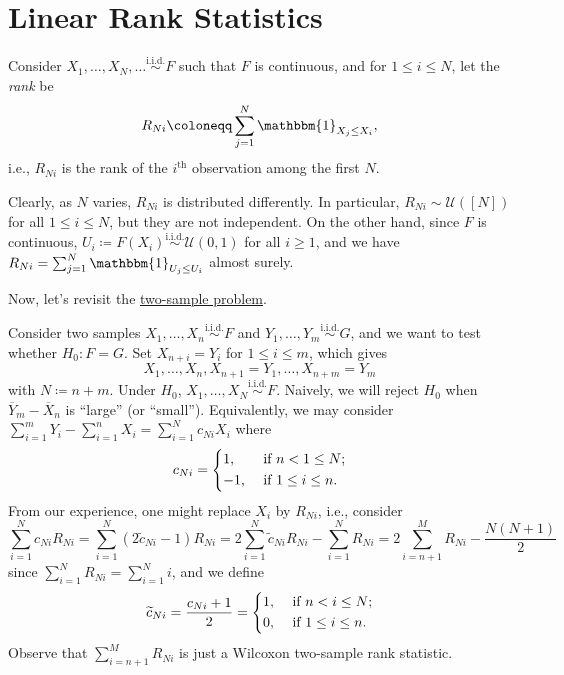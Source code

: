 \section{Linear Rank Statistics}
Consider \(X_1, \dots , X_N, \dots \overset{\text{i.i.d.} }{\sim } F\) such that \(F\) is continuous, and for \(1 \leq i \leq N\), let the \emph{rank} be
\[
	R_{Ni}
	\coloneqq \sum_{j=1}^{N} \mathbbm{1}_{X_j \leq X_i},
\]
i.e., \(R_{Ni}\) is the rank of the \(i^{\text{th} }\) observation among the first \(N\).

\begin{remark}
	Clearly, as \(N\) varies, \(R_{Ni}\) is distributed differently. In particular, \(R_{Ni} \sim \mathcal{U} ([N])\) for all \(1 \leq i \leq N\), but they are not independent. On the other hand, since \(F\) is continuous, \(U_i \coloneqq F(X_i)\overset{\text{i.i.d.} }{\sim } \mathcal{U} (0, 1)\) for all \(i \geq 1\), and we have \(R_{Ni} = \sum_{j=1}^{N} \mathbbm{1}_{U_j \leq U_i} \) almost surely.
\end{remark}

Now, let's revisit the \hyperref[prb:two-sample]{two-sample problem}.

\begin{eg}
	Consider two samples \(X_1, \dots , X_n \overset{\text{i.i.d.} }{\sim } F\) and \(Y_1, \dots , Y_m \overset{\text{i.i.d.} }{\sim } G\), and we want to test whether \(H_0 \colon F = G\). Set \(X_{n+i} = Y_i\) for \(1 \leq i \leq m\), which gives
	\[
		X_1, \dots , X_n , X_{n+1} = Y_1, \dots , X_{n+m} = Y_m
	\]
	with \(N \coloneqq n + m\). Under \(H_0\), \(X_1, \dots , X_N \overset{\text{i.i.d.} }{\sim } F\). Naively, we will reject \(H_0\) when \(\overline{Y} _m - \overline{X} _n\) is ``large'' (or ``small''). Equivalently, we may consider \(\sum_{i=1}^{m} Y_i - \sum_{i=1}^{n} X_i = \sum_{i=1}^{N} c_{Ni} X_i\) where
	\[
		c_{Ni}
		= \begin{dcases}
			1,  & \text{ if } n < 1 \leq N ;   \\
			-1, & \text{ if } 1 \leq i \leq n.
		\end{dcases}
	\]
	From our experience, one might replace \(X_i\) by \(R_{Ni}\), i.e., consider
	\[
		\sum_{i=1}^{N} c_{Ni} R_{Ni}
		= \sum_{i=1}^{N} (2 \widetilde{c} _{Ni} - 1) R_{Ni}
		= 2 \sum_{i=1}^{N} \widetilde{c} _{Ni} R_{Ni} - \sum_{i=1}^{N} R_{Ni}
		= 2 \sum_{i=n+1}^{M} R_{Ni} - \frac{N(N+1)}{2}
	\]
	since \(\sum_{i=1}^{N} R_{Ni} = \sum_{i=1}^{N} i\), and we define
	\[
		\widetilde{c} _{Ni}
		= \frac{c_{Ni} + 1}{2}
		= \begin{dcases}
			1, & \text{ if } n < i \leq N ;   \\
			0, & \text{ if } 1 \leq i \leq n.
		\end{dcases}
	\]
	Observe that \(\sum_{i=n+1}^{M} R_{Ni}\) is just a Wilcoxon two-sample rank statistic.
\end{eg}

